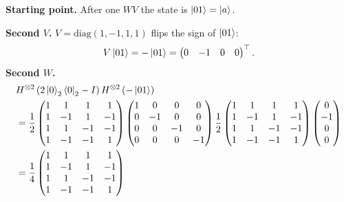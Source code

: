\documentclass[a4paper, 10pt]{article}
\begin{document}
\begin{solution}
	\noindent \textbf{Starting point.} After one \( WV \) the state is \( \ket{01} = \ket{a} \).

	\myspace

	\noindent \textbf{Second \( V \).} \( V = \mathrm{diag}(1, -1, 1, 1) \) flips the sign of \( \ket{01} \):
	\[
		V\ket{01} = -\ket{01} = \begin{pmatrix} 0 & -1 & 0 & 0 \end{pmatrix}^{\top}.
	\]
	\noindent \textbf{Second \( W \).}
	\begin{align*}
		 & H^{\otimes 2}\paren{2\ket{0}_2\bra{0}_2 - I}H^{\otimes 2}\paren{-\ket{01}} \\
		 & = \frac{1}{2}\begin{pmatrix}
			                1 & 1  & 1  & 1  \\
			                1 & -1 & 1  & -1 \\
			                1 & 1  & -1 & -1 \\
			                1 & -1 & -1 & 1
		                \end{pmatrix}
		\begin{pmatrix}
			1 & 0  & 0  & 0  \\
			0 & -1 & 0  & 0  \\
			0 & 0  & -1 & 0  \\
			0 & 0  & 0  & -1
		\end{pmatrix}
		\frac{1}{2}\begin{pmatrix}
			           1 & 1  & 1  & 1  \\
			           1 & -1 & 1  & -1 \\
			           1 & 1  & -1 & -1 \\
			           1 & -1 & -1 & 1
		           \end{pmatrix}
		\begin{pmatrix} 0 \\ -1 \\ 0 \\ 0 \end{pmatrix}                               \\
		 & = \frac{1}{4}\begin{pmatrix}
			                1 & 1  & 1  & 1  \\
			                1 & -1 & 1  & -1 \\
			                1 & 1  & -1 & -1 \\
			                1 & -1 & -1 & 1
		                \end{pmatrix}

\end{align*}
\end{solution}
\end{document}
